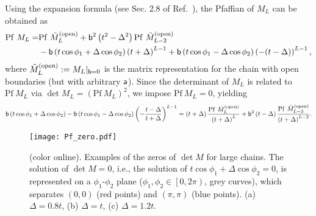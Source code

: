 \documentclass[aps, prb, showpacs, twocolumn, %
amssymb,superscriptaddress]{revtex4}
\begin{document}
\onecolumngrid
\medskip
Using the expansion formula (see Sec. 2.8 of Ref.~), the Pfaffian of $M_L$ can be obtained as
\begin{align}
\begin{split}
\mathrm{Pf}~M_{L}
=&\mathrm{Pf}~\tilde{M}_{L}^{\mathrm{(open)}} + {\sf b}^{2} \left( t^2 -\Delta^2 \right) \mathrm{Pf}~\tilde{M}_{L-2}^{\mathrm{(open)}} \\
&- {\sf b} \left( t \cos \phi_{1} + \Delta \cos \phi_{2} \right) \left( t + \Delta \right)^{L-1}
+ {\sf b} \left( t \cos \phi_{1} - \Delta \cos \phi_{2} \right) \left(- ( t - \Delta ) \right)^{L-1},
\end{split}
	\label{eq:PfExplicit}
\end{align}
where $\tilde{M}^{\left( \mathrm{open} \right)}_{L} := M_{L}|_{{\sf b}=0}$ is the matrix representation for the chain with open boundaries (but with arbitrary ${\sf a}$).
Since the determinant of $M_L$ is related to $\mathrm{Pf}~M_{L}$ via $\det M_{L}= \left( \mathrm{Pf}~M_{L} \right)^{2}$,
we impose $\mathrm{Pf}~M_{L}=0$, yielding
\begin{equation}
\begin{split}
{\sf b} \left( t \cos \phi_{1} + \Delta \cos \phi_{2} \right) 
- {\sf b} \left( t \cos \phi_{1} - \Delta \cos \phi_{2} \right) \left( - \frac{t-\Delta}{t+\Delta} \right)^{L-1}
=\left( t+\Delta \right) \frac{\mathrm{Pf}~\tilde{M}_{L}^{\mathrm{(open)}}}{\left( t+\Delta \right)^{L}} 
+ {\sf b}^{2} \left( t-\Delta \right) \frac{\mathrm{Pf}~\tilde{M}_{L-2}^{\mathrm{(open)}}}{\left( t+\Delta \right)^{L-2}}.
\end{split}
	\label{eq:rhsconverge}
\end{equation}


\begin{figure*}[t]
\centering
\texttt{[image: Pf\_zero.pdf]}
\caption{(color online). Examples of the zeros of $\det M$ for large chains. The solution of $\det M=0$, i.e., the solution of $t \cos \phi_{1} + \Delta \cos \phi_{2} = 0$, is represented on a $\phi_{1}$-$\phi_{2}$ plane ($\phi_{1}, \phi_{2} \in \left[ 0, 2\pi \right)$, grey curves), which separates $(0, 0)$ (red points) and $(\pi,\pi)$ (blue points).  (a) $\Delta = 0.8t$, (b) $\Delta = t$, (c) $\Delta = 1.2t$.}
	\label{fig:PfZero}
\end{figure*}
\end{document}
